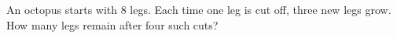 An octopus starts with 8 legs. Each time one leg is cut off, three new legs grow. How many legs remain after four such cuts?

